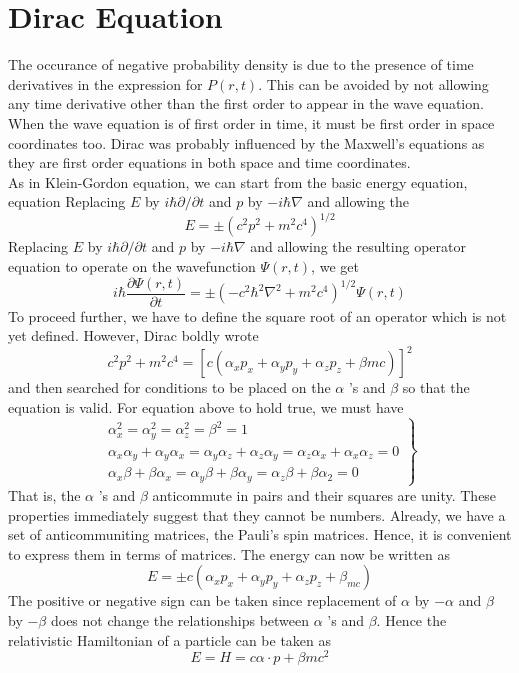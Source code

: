  \section{Dirac Equation}
 The occurance of negative probability density is due to the presence of time derivatives in the expression for $P(r, t)$. This can be avoided by not allowing any time derivative other than the first order to appear in the wave equation. When the wave equation is of first order in time, it must be first order in space coordinates too. Dirac was probably influenced by the Maxwell's equations as they are first order equations in both space and time coordinates.\\
 As in Klein-Gordon equation, we can start from the basic energy equation, equation 
 Replacing $E$ by $i \hbar \partial / \partial t$ and $p$ by $-i \hbar \nabla$ and allowing the $$E=\pm\left(c^{2} p^{2}+m^{2} c^{4}\right)^{1 / 2}$$
 Replacing $E$ by $i \hbar \partial / \partial t$ and $p$ by $-i \hbar \nabla$ and allowing the resulting operator equation to operate on the wavefunction $\Psi(r, t)$, we get\\
 $$i \hbar \frac{\partial \Psi(r, t)}{\partial t}=\pm\left(-c^{2} \hbar^{2} \nabla^{2}+m^{2} c^{4}\right)^{1 / 2} \Psi(r, t)$$
 To proceed further, we have to define the square root of an operator which is not yet defined. However, Dirac boldly wrote
 $$c^{2} p^{2}+m^{2} c^{4}=\left[c\left(\alpha_{x} p_{x}+\alpha_{y} p_{y}+\alpha_{z} p_{z}+\beta m c\right)\right]^{2}$$
 and then searched for conditions to be placed on the $\alpha$ 's and $\beta$ so that the equation is valid. For equation above to hold true, we must have
$$\left.\begin{array}{r}
	\alpha_{x}^{2}=\alpha_{y}^{2}=\alpha_{z}^{2}=\beta^{2}=1 \\
	\alpha_{x} \alpha_{y}+\alpha_{y} \alpha_{x}=\alpha_{y} \alpha_{z}+\alpha_{z} \alpha_{y}=\alpha_{z} \alpha_{x}+\alpha_{x} \alpha_{z}=0 \\
	\alpha_{x} \beta+\beta \alpha_{x}=\alpha_{y} \beta+\beta \alpha_{y}=\alpha_{z} \beta+\beta \alpha_{2}=0
\end{array}\right\}$$
That is, the $\alpha$ 's and $\beta$ anticommute in pairs and their squares are unity. These properties immediately suggest that they cannot be numbers. Already, we have a set of anticommuniting matrices, the Pauli's spin matrices. Hence, it is convenient to express them in terms of matrices. The energy can now be written as
$$E=\pm c\left(\alpha_{x} p_{x}+\alpha_{y} p_{y}+\alpha_{z} p_{z}+\beta_{m c}\right)$$
The positive or negative sign can be taken since replacement of $\alpha$ by $-\alpha$ and $\beta$ by $-\beta$ does not change the relationships between $\alpha$ 's and $\beta$. Hence the relativistic Hamiltonian of a particle can be taken as $$E=H=c \alpha \cdot p+\beta m c^{2}$$
